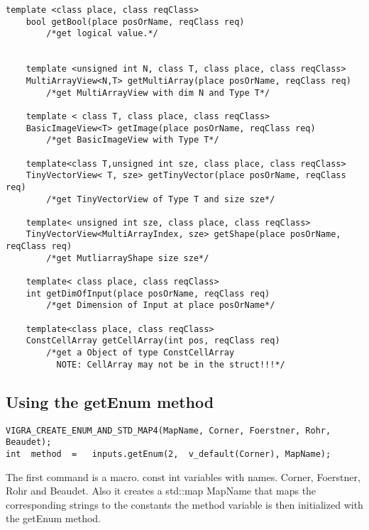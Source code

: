 \documentclass[a4paper,10pt]{article}
\begin{document}
\begin{lstlisting}[caption={matlab::InputArray}]
	template <class place, class reqClass>
	bool getBool(place posOrName, reqClass req)
		/*get logical value.*/


	template <unsigned int N, class T, class place, class reqClass>
	MultiArrayView<N,T> getMultiArray(place posOrName, reqClass req)
		/*get MultiArrayView with dim N and Type T*/
	
	template < class T, class place, class reqClass>
	BasicImageView<T> getImage(place posOrName, reqClass req)
		/*get BasicImageView with Type T*/

	template<class T,unsigned int sze, class place, class reqClass>
	TinyVectorView< T, sze> getTinyVector(place posOrName, reqClass req)
		/*get TinyVectorView of Type T and size sze*/

	template< unsigned int sze, class place, class reqClass>
	TinyVectorView<MultiArrayIndex, sze> getShape(place posOrName, reqClass req)
		/*get MutliarrayShape size sze*/

	template< class place, class reqClass>
	int getDimOfInput(place posOrName, reqClass req)
		/*get Dimension of Input at place posOrName*/

	template<class place, class reqClass>
	ConstCellArray getCellArray(int pos, reqClass req)
		/*get a Object of type ConstCellArray
		  NOTE: CellArray may not be in the struct!!!*/
\end{lstlisting}

\subsection{Using the getEnum method}
\begin{lstlisting}
VIGRA_CREATE_ENUM_AND_STD_MAP4(MapName, Corner, Foerstner, Rohr, Beaudet);
int  method  =   inputs.getEnum(2,  v_default(Corner), MapName);
\end{lstlisting}
The first command is a macro. const int variables with names.
Corner, Foerstner, Rohr and Beaudet. Also it creates a std::map MapName that maps the 
corresponding strings to the constants
the method variable is then initialized with the getEnum method. 
\end{document}
